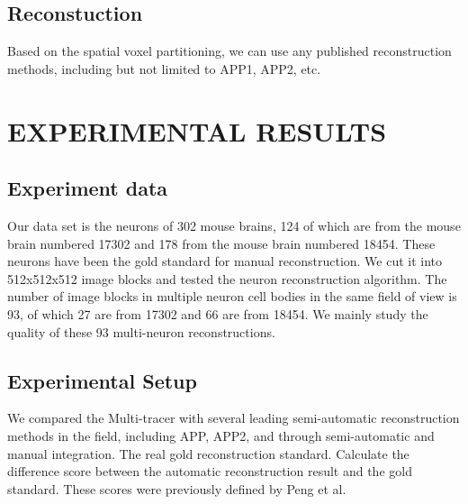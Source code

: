 \documentclass[runningheads]{llncs}
\begin{document}
\subsection{Reconstuction}
Based on the spatial voxel partitioning, we can use any published reconstruction methods, including but not limited to APP1, APP2, etc.

\section{EXPERIMENTAL RESULTS}
\subsection{Experiment data}
Our data set is the neurons of 302 mouse brains, 124 of which are from the mouse brain numbered 17302 and 178 from the mouse brain numbered 18454. These neurons have been the gold standard for manual reconstruction. We cut it into 512x512x512 image blocks and tested the neuron reconstruction algorithm. The number of image blocks in multiple neuron cell bodies in the same field of view is 93, of which 27 are from 17302 and 66 are from 18454. We mainly study the quality of these 93 multi-neuron reconstructions.
\subsection{Experimental Setup}
We compared the Multi-tracer with several leading semi-automatic reconstruction methods in the field, including APP, APP2, and through semi-automatic and manual integration.
The real gold reconstruction standard. Calculate the difference score between the automatic reconstruction result and the gold standard. These scores were previously defined by Peng et al.
\end{document}
